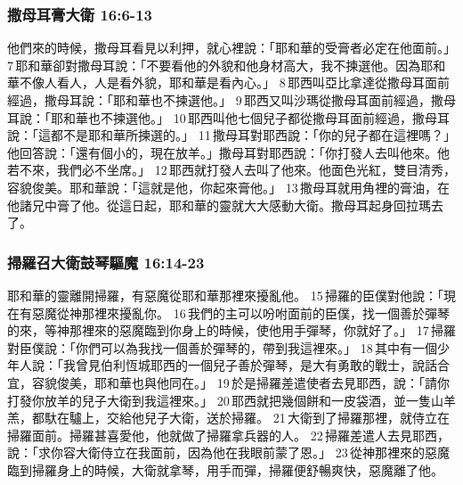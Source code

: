 \subsubsection{撒母耳膏大衛 16:6-13}
他們來的時候，撒母耳看見以利押，就心裡說：「耶和華的受膏者必定在他面前。」 7 耶和華卻對撒母耳說：「不要看他的外貌和他身材高大，我不揀選他。因為耶和華不像人看人，人是看外貌，耶和華是看內心。」 8 耶西叫亞比拿達從撒母耳面前經過，撒母耳說：「耶和華也不揀選他。」 9 耶西又叫沙瑪從撒母耳面前經過，撒母耳說：「耶和華也不揀選他。」 10 耶西叫他七個兒子都從撒母耳面前經過，撒母耳說：「這都不是耶和華所揀選的。」 11 撒母耳對耶西說：「你的兒子都在這裡嗎？」他回答說：「還有個小的，現在放羊。」撒母耳對耶西說：「你打發人去叫他來。他若不來，我們必不坐席。」 12 耶西就打發人去叫了他來。他面色光紅，雙目清秀，容貌俊美。耶和華說：「這就是他，你起來膏他。」 13 撒母耳就用角裡的膏油，在他諸兄中膏了他。從這日起，耶和華的靈就大大感動大衛。撒母耳起身回拉瑪去了。

\subsubsection{掃羅召大衛鼓琴驅魔 16:14-23}
耶和華的靈離開掃羅，有惡魔從耶和華那裡來擾亂他。 15 掃羅的臣僕對他說：「現在有惡魔從神那裡來擾亂你。 16 我們的主可以吩咐面前的臣僕，找一個善於彈琴的來，等神那裡來的惡魔臨到你身上的時候，使他用手彈琴，你就好了。」 17 掃羅對臣僕說：「你們可以為我找一個善於彈琴的，帶到我這裡來。」 18 其中有一個少年人說：「我曾見伯利恆城耶西的一個兒子善於彈琴，是大有勇敢的戰士，說話合宜，容貌俊美，耶和華也與他同在。」 19 於是掃羅差遣使者去見耶西，說：「請你打發你放羊的兒子大衛到我這裡來。」 20 耶西就把幾個餅和一皮袋酒，並一隻山羊羔，都馱在驢上，交給他兒子大衛，送於掃羅。 21 大衛到了掃羅那裡，就侍立在掃羅面前。掃羅甚喜愛他，他就做了掃羅拿兵器的人。 22 掃羅差遣人去見耶西，說：「求你容大衛侍立在我面前，因為他在我眼前蒙了恩。」 23 從神那裡來的惡魔臨到掃羅身上的時候，大衛就拿琴，用手而彈，掃羅便舒暢爽快，惡魔離了他。

